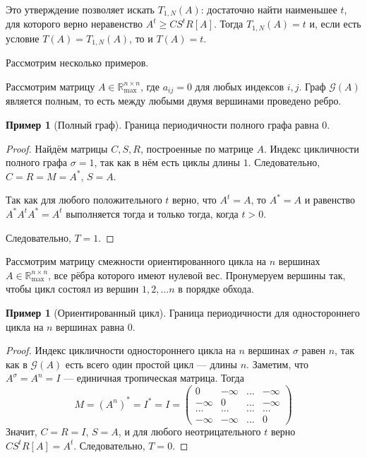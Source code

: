 \documentclass[12pt]{article}
\theoremstyle{definition}
\newtheorem{example}[theorem]{Пример}
\begin{document}
Это утверждение позволяет искать $T_{1, N}(A)$: достаточно найти наименьшее $t$, для которого верно неравенство $A^t \ge CS^tR[A]$. Тогда $T_{1, N}(A) = t$ и, если есть условие $T(A) = T_{1, N}(A)$, то и $T(A) = t$.

Рассмотрим несколько примеров.

Рассмотрим матрицу $A \in \mathbb{R}_{\max}^{n \times n}$, где $a_{ij} = 0$ для любых индексов $i, j$. Граф $\mathcal{G}(A)$ является полным, то есть между любыми двумя вершинами проведено ребро.

\begin{example} [Полный граф]
Граница периодичности полного графа равна $0$.
\end{example}
\begin{proof}
Найдём матрицы $C, S, R$, построенные по матрице $A$. Индекс цикличности полного графа $\sigma = 1$, так как в нём есть циклы длины $1$. Следовательно, $C = R = M = A^*$, $S = A$.

Так как для любого положительного $t$ верно, что $A^t = A$, то $A^* = A$ и равенство $A^*A^tA^* = A^t$ выполняется тогда и только тогда, когда $t > 0$.

Следовательно, $T = 1$.
\end{proof}

Рассмотрим матрицу смежности ориентированного цикла на $n$ вершинах $A \in \mathbb{R}_{\max}^{n \times n}$, все рёбра которого имеют нулевой вес. Пронумеруем вершины так, чтобы цикл состоял из вершин $1, 2, \dots n$ в порядке обхода.

\begin{example}[Ориентированный цикл]
\label{directedCycleExample}
Граница периодичности для одностороннего цикла на $n$ вершинах равна $0$.
\end{example}
\begin{proof}
Индекс цикличности одностороннего цикла на $n$ вершинах $\sigma$ равен $n$, так как в $\mathcal{G}(A)$ есть всего один простой цикл --- длины $n$. Заметим, что $A^{\sigma} = A^n = I$ --- единичная тропическая матрица. Тогда
\begin{equation*}
M = (A^n)^* = I^* = I = \begin{pmatrix}
0 & -\infty & ... & -\infty \\
-\infty & 0 & ... & -\infty \\
... & ... & ... & ... \\
-\infty & -\infty & ... & 0
\end{pmatrix}
\end{equation*}
Значит, $C = R = I$, $S = A$, и для любого неотрицательного $t$ верно $CS^tR[A] = A^t$. Следовательно, $T = 0$.
\end{proof}
\end{document}
